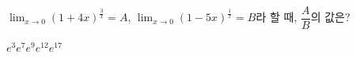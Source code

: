 $\displaystyle\lim_{x\to 0}(1+4x)^{\frac{3}{x}}=A$, $\displaystyle\lim_{x\to 0}(1-5x)^{\frac{1}{x}}=B$라 할 때, $\dfrac{A}{B}$의 값은?
\begin{choices32}{$e^3$}{$e^7$}{$e^9$}{$e^{12}$}{$e^{17}$}\end{choices32}
